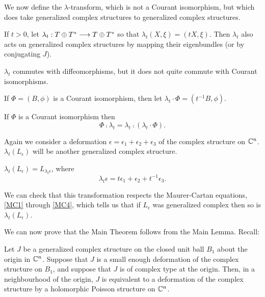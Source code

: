 \documentclass{article}
\begin{document}
We now define the $\lambda$-transform, which is not a Courant isomorphism, but which does take generalized complex structures to generalized complex structures.

\begin{defn}
If $t>0$, let $\lambda_t : T \oplus T^* \longrightarrow T \oplus T^*$ so that $\lambda_t(X,\xi) = (tX,\xi)$.  Then $\lambda_t$ also acts on generalized complex structures by mapping their eigenbundles (or by conjugating $J$).
\end{defn}

$\lambda_t$ commutes with diffeomorphisms, but it does not quite commute with Courant isomorphisms.
\begin{notn}
If $\Phi = (B,\phi)$ is a Courant isomorphism, then let $\lambda_t\cdot\Phi = (t^{-1}B,\phi)$.
\end{notn}

\begin{prop}
If $\Phi$ is a Courant isomorphism then
$$\Phi \comp \lambda_t = \lambda_t \comp (\lambda_t\cdot\Phi).$$
\end{prop}

Again we consider a deformation $\epsilon = \epsilon_1 + \epsilon_2 + \epsilon_3$ of the complex structure on $\mathbb C^n$.  $\lambda_t(L_\epsilon)$ will be another generalized complex structure.

\begin{prop}\label{lambda action}
$\lambda_t(L_\epsilon) = L_{\lambda_t\epsilon}$, where
$$\lambda_t\epsilon = t \epsilon_1 + \epsilon_2 + t^{-1} \epsilon_3.$$
\end{prop}

\begin{rem}
We can check that this transformation respects the Maurer-Cartan equations, \eqref{MC1} through \eqref{MC4}, which tells us that if $L_\epsilon$ was generalized complex then so is $\lambda_t(L_\epsilon)$.
\end{rem}

We can now prove that the Main Theorem follows from the Main Lemma.  Recall: 
\begin{main lem}
Let $J$ be a generalized complex structure on the closed unit ball $B_1$ about the origin in $\mathbb C^n$.  Suppose that $J$ is a small enough deformation of the complex structure on $B_1$, and suppose that $J$ is of complex type at the origin.  Then, in a neighbourhood of the origin, $J$ is equivalent to a deformation of the complex structure by a holomorphic Poisson structure on $\mathbb C^n$.
\end{main lem}
\end{document}
